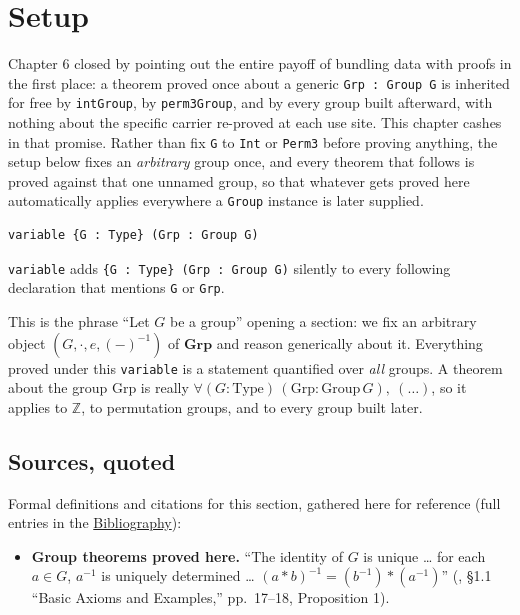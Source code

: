 \section{Setup}\label{sec:07-group-theorems:01-setup:1}

Chapter 6 closed by pointing out the entire payoff of bundling data with proofs in the first place: a theorem proved once about a generic \texttt{Grp : Group G} is inherited for free by \texttt{intGroup}, by \texttt{perm3Group}, and by every group built afterward, with nothing about the specific carrier re-proved at each use site. This chapter cashes in that promise. Rather than fix \texttt{G} to \texttt{Int} or \texttt{Perm3} before proving anything, the setup below fixes an \emph{arbitrary} group once, and every theorem that follows is proved against that one unnamed group, so that whatever gets proved here automatically applies everywhere a \texttt{Group} instance is later supplied.

\begin{lstlisting}
variable {G : Type} (Grp : Group G)
\end{lstlisting}

\texttt{variable} adds \texttt{\{G : Type\} (Grp : Group G)} silently to every following declaration that mentions \texttt{G} or \texttt{Grp}.

\begin{mathreading}

This is the phrase ``Let \(G\) be a group'' opening a section: we fix an arbitrary object \((G, \cdot, e, (-)^{-1})\) of \(\mathbf{Grp}\) and reason generically about it. Everything proved under this \texttt{variable} is a statement quantified over \emph{all} groups. A theorem about the group \(\mathrm{Grp}\) is really \(\forall (G : \mathrm{Type})\,(\mathrm{Grp} : \mathrm{Group}\,G),\ (\ldots)\), so it applies to \(\mathbb{Z}\), to permutation groups, and to every group built later.

\end{mathreading}

\subsection{Sources, quoted}\label{sec:07-group-theorems:01-setup:2}

Formal definitions and citations for this section, gathered here for reference (full entries in the \hyperref[sec:root:bibliography:1]{Bibliography}):

\begin{itemize}
\tightlist
\item
  \textbf{Group theorems proved here.} ``The identity of \(G\) is unique \ldots{} for each \(a \in G\), \(a^{-1}\) is uniquely determined \ldots{} \((a{*}b)^{-1} = (b^{-1}){*}(a^{-1})\)'' (\cite{DummitFoote2003}, §1.1 ``Basic Axioms and Examples,'' pp.~17--18, Proposition 1).
\end{itemize}
